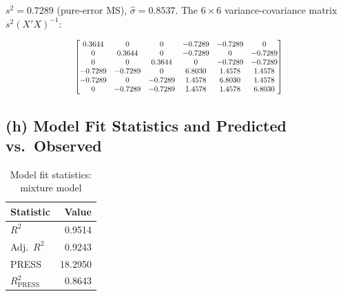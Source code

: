 \documentclass[12pt,a4paper]{article}
\begin{document}
$s^2 = 0.7289$ (pure-error MS), $\hat{\sigma} = 0.8537$.
The $6 \times 6$ variance-covariance matrix $s^2(X'X)^{-1}$:

\[
\scalebox{0.78}{$
\begin{bmatrix}
 0.3644 &  0      &  0      & -0.7289 & -0.7289 &  0      \\
 0      &  0.3644 &  0      & -0.7289 &  0      & -0.7289 \\
 0      &  0      &  0.3644 &  0      & -0.7289 & -0.7289 \\
-0.7289 & -0.7289 &  0      &  6.8030 &  1.4578 &  1.4578 \\
-0.7289 &  0      & -0.7289 &  1.4578 &  6.8030 &  1.4578 \\
 0      & -0.7289 & -0.7289 &  1.4578 &  1.4578 &  6.8030
\end{bmatrix}
$}
\]

\subsection{(h) Model Fit Statistics and Predicted vs.\ Observed}

\begin{table}[H]
\centering
\caption{Model fit statistics: mixture model}
\begin{tabular}{lr}
\toprule
Statistic & Value \\
\midrule
$R^2$                    & 0.9514 \\
Adj.\ $R^2$             & 0.9243 \\
PRESS                    & 18.2950 \\
$R^2_{\text{PRESS}}$     & 0.8643 \\
\bottomrule
\end{tabular}
\end{table}
\end{document}

